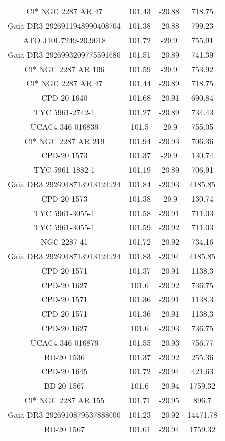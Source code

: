 \begin{table}
\begin{tabular}{cccc}
Cl* NGC 2287     AR      47 & 101.43 & -20.88 & 718.75 \\
Gaia DR3 2926911948990408704 & 101.38 & -20.88 & 799.23 \\
ATO J101.7249-20.9018 & 101.72 & -20.9 & 755.91 \\
Gaia DR3 2926993209775591680 & 101.51 & -20.89 & 741.39 \\
Cl* NGC 2287     AR     106 & 101.59 & -20.9 & 753.92 \\
Cl* NGC 2287     AR      47 & 101.44 & -20.89 & 718.75 \\
CPD-20  1640 & 101.68 & -20.91 & 690.84 \\
TYC 5961-2742-1 & 101.27 & -20.89 & 734.43 \\
UCAC4 346-016839 & 101.5 & -20.9 & 755.05 \\
Cl* NGC 2287     AR     219 & 101.94 & -20.93 & 706.36 \\
CPD-20  1573 & 101.37 & -20.9 & 130.74 \\
TYC 5961-1882-1 & 101.19 & -20.89 & 706.91 \\
Gaia DR3 2926948713913124224 & 101.84 & -20.93 & 4185.85 \\
CPD-20  1573 & 101.38 & -20.9 & 130.74 \\
TYC 5961-3055-1 & 101.58 & -20.91 & 711.03 \\
TYC 5961-3055-1 & 101.59 & -20.92 & 711.03 \\
NGC  2287    41 & 101.72 & -20.92 & 734.16 \\
Gaia DR3 2926948713913124224 & 101.83 & -20.94 & 4185.85 \\
CPD-20  1571 & 101.37 & -20.91 & 1138.3 \\
CPD-20  1627 & 101.6 & -20.92 & 736.75 \\
CPD-20  1571 & 101.36 & -20.91 & 1138.3 \\
CPD-20  1571 & 101.36 & -20.91 & 1138.3 \\
CPD-20  1627 & 101.6 & -20.93 & 736.75 \\
UCAC4 346-016879 & 101.55 & -20.93 & 756.77 \\
BD-20  1536 & 101.37 & -20.92 & 255.36 \\
CPD-20  1645 & 101.72 & -20.94 & 421.63 \\
BD-20  1567 & 101.6 & -20.94 & 1759.32 \\
Cl* NGC 2287     AR     155 & 101.71 & -20.95 & 896.7 \\
Gaia DR3 2926910879537888000 & 101.23 & -20.92 & 14471.78 \\
BD-20  1567 & 101.61 & -20.94 & 1759.32 \\

\end{tabular}
\end{table}
